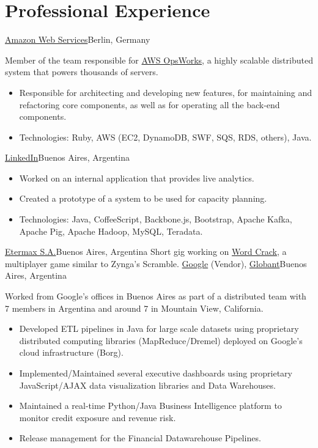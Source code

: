 \documentclass[11pt,a4paper,sans]{moderncv}
\newcommand\weblink[2] {{\color{href} \href{#1}{#2}}}
\begin{document}
\section{Professional Experience}
{\weblink{http://aws.amazon.com/}{Amazon Web Services}}{Berlin, Germany}{}{%
Member of the team responsible for \weblink{http://aws.amazon.com/opsworks/}{AWS OpsWorks},
a highly scalable distributed system that powers thousands of servers.
\begin{itemize}
  \item Responsible for architecting and developing new features, for
    maintaining and refactoring core components, as well as for operating all
    the back-end components.
  \item Technologies: Ruby, AWS (EC2, DynamoDB, SWF, SQS, RDS, others), Java.
\end{itemize}
}
%
{\weblink{http://linkedin.com/}{LinkedIn}}{Buenos Aires, Argentina}{}{%
\begin{itemize}
  \item Worked on an internal application that provides live analytics.
  \item Created a prototype of a system to be used for capacity planning.
  \item Technologies: Java, CoffeeScript, Backbone.js, Bootstrap, Apache Kafka,
    Apache Pig, Apache Hadoop, MySQL, Teradata.
\end{itemize}
}
%
{\weblink{http://etermax.com/}{Etermax S.A.}}{Buenos Aires, Argentina}{}{%
Short gig working on
\weblink{https://play.google.com/store/apps/details?id=com.etermax.wordcrack.lite}{Word
Crack}, a multiplayer game similar to Zynga's Scramble.}
%
{\weblink{http://www.google.com}{Google} (Vendor),
\weblink{http://www.globant.com}{Globant}}{Buenos Aires, Argentina}{}{%
Worked from Google's offices in Buenos Aires as part of a distributed team with
7 members in Argentina and around 7 in Mountain View, California.
\begin{itemize}
  \item Developed ETL pipelines in Java for large scale datasets using
proprietary distributed computing libraries (MapReduce/Dremel) deployed on Google's
cloud infrastructure (Borg).
  \item Implemented/Maintained several executive dashboards using proprietary
JavaScript/AJAX data visualization libraries and Data Warehouses.
  \item Maintained a real-time Python/Java Business Intelligence platform to
monitor credit exposure and revenue risk.
  \item Release management for the Financial Datawarehouse Pipelines.
\end{itemize}
}
\end{document}
